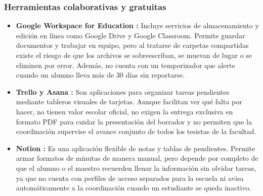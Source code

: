 \subsubsection{Herramientas colaborativas y gratuitas}
\begin{itemize}
    \item \textbf{Google Workspace for Education \parencite{google2024workspace}:} Incluye servicios de almacenamiento y edición en línea como Google Drive y Google Classroom. Permite guardar documentos y trabajar en equipo, pero al tratarse de carpetas compartidas existe el riesgo de que los archivos se sobreescriban, se muevan de lugar o se eliminen por error. Además, no cuenta con un temporizador que alerte cuando un alumno lleva más de 30 días sin reportarse.
    \item \textbf{Trello \parencite{atlassian2024trello} y Asana \parencite{asana2024work}:} Son aplicaciones para organizar tareas pendientes mediante tableros visuales de tarjetas. Aunque facilitan ver qué falta por hacer, no tienen valor escolar oficial, no exigen la entrega exclusiva en formato PDF para cuidar la presentación del borrador y no permiten que la coordinación supervise el avance conjunto de todos los tesistas de la facultad.
    \item \textbf{Notion \parencite{notion2024labs}:} Es una aplicación flexible de notas y tablas de pendientes. Permite armar formatos de minutas de manera manual, pero depende por completo de que el alumno o el maestro recuerden llenar la información sin olvidar tareas, ya que no cuenta con perfiles de acceso separados para la escuela ni avisa automáticamente a la coordinación cuando un estudiante se queda inactivo.
\end{itemize}

